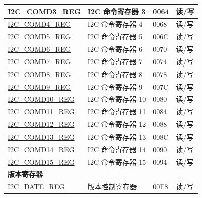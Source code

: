 \begin{longtable}{ | m{6cm} | p{7.2cm} | p{1.3cm} | p{1cm} | }
\hyperref[regdesc:I2CCOMD3REG]{I2C\_COMD3\_REG} & I2C 命令寄存器 3 & \hexprefix{}0064 & 读/写 \\ \hline
\hyperref[regdesc:I2CCOMD4REG]{I2C\_COMD4\_REG} & I2C 命令寄存器 4 & \hexprefix{}0068 & 读/写 \\ \hline
\hyperref[regdesc:I2CCOMD5REG]{I2C\_COMD5\_REG} & I2C 命令寄存器 5 & \hexprefix{}006C & 读/写 \\ \hline
\hyperref[regdesc:I2CCOMD6REG]{I2C\_COMD6\_REG} & I2C 命令寄存器 6 & \hexprefix{}0070 & 读/写 \\ \hline
\hyperref[regdesc:I2CCOMD7REG]{I2C\_COMD7\_REG} & I2C 命令寄存器 7 & \hexprefix{}0074 & 读/写 \\ \hline
\hyperref[regdesc:I2CCOMD8REG]{I2C\_COMD8\_REG} & I2C 命令寄存器 8 & \hexprefix{}0078 & 读/写 \\ \hline
\hyperref[regdesc:I2CCOMD9REG]{I2C\_COMD9\_REG} & I2C 命令寄存器 9 & \hexprefix{}007C & 读/写 \\ \hline
\hyperref[regdesc:I2CCOMD10REG]{I2C\_COMD10\_REG} & I2C 命令寄存器 10 & \hexprefix{}0080 & 读/写 \\ \hline
\hyperref[regdesc:I2CCOMD11REG]{I2C\_COMD11\_REG} & I2C 命令寄存器 11 & \hexprefix{}0084 & 读/写 \\ \hline
\hyperref[regdesc:I2CCOMD12REG]{I2C\_COMD12\_REG} & I2C 命令寄存器 12 & \hexprefix{}0088 & 读/写 \\ \hline
\hyperref[regdesc:I2CCOMD13REG]{I2C\_COMD13\_REG} & I2C 命令寄存器 13 & \hexprefix{}008C & 读/写 \\ \hline
\hyperref[regdesc:I2CCOMD14REG]{I2C\_COMD14\_REG} & I2C 命令寄存器 14 & \hexprefix{}0090 & 读/写 \\ \hline
\hyperref[regdesc:I2CCOMD15REG]{I2C\_COMD15\_REG} & I2C 命令寄存器 15 & \hexprefix{}0094 & 读/写 \\ \hline
\multicolumn{4}{|l|}{\textbf{版本寄存器}} \\ \hline
\hyperref[regdesc:I2CDATEREG]{I2C\_DATE\_REG} & 版本控制寄存器 & \hexprefix{}00F8 & 读/写 \\ \hline
\end{longtable}
